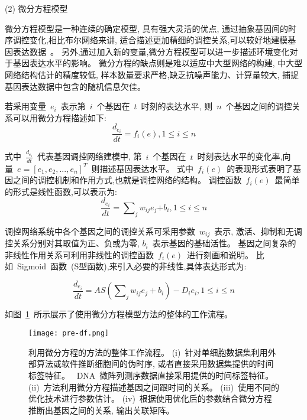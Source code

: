 (2) 微分方程模型

微分方程模型是一种连续的确定模型, 具有强大灵活的优点,
通过抽象基因间的时序调控变化,相比布尔网络来讲, 适合描述更加精细的调控关系,可以较好地建模基因表达数据~\cite{gardner2003inferring,di2005chemogenomic,bansal2006inference, honkela2010model,lu2011high,li2011large}。
另外,通过加入新的变量,微分方程模型可以进一步描述环境变化对于基因表达水平的影响。
微分方程的缺点则是难以适应中大型网络的构建, 中大型网络结构估计的精度较低,
样本数量要求严格,缺乏抗噪声能力、计算量较大, 捕捉基因表达数据中包含的随机信息欠佳。

若采用变量~$e_i$~表示第~$i$~个基因在~$t$~时刻的表达水平, 则~$n$~个基因之间的调控关系可以用微分方程描述如下:
\begin{equation}
\frac{{d_{e_i}}}{{dt}} = f_i (e),1 \le i \le n
\end{equation}

式中~$\frac{{d_{e_i }}}{{dt}}$~代表基因调控网络建模中,
第~$i$~个基因在~$t$~时刻表达水平的变化率,向量~$e=[e_1,e_2,...,e_n]^T$~则描述基因表达水平。
式中~$f_i(e)$~的表现形式表明了基因之间的调控机制和作用方式,也就是调控网络的结构。
调控函数~$f_i(e)$~最简单的形式是线性函数,可以表示为:
\begin{equation}
\frac{{d_{e_i }}}{{dt}} = \sum\nolimits_j {w_{ij} e_j} { + b_i } ,1 \le i \le n
\end{equation}

调控网络系统中各个基因之间的调控关系可采用参数~$w_{ij}$~表示,
激活、抑制和无调控关系分别对其取值为正、负或为零, $b_i$~表示基因的基础活性。
基因之间复杂的非线性作用关系可利用非线性的调控函数~$f_i(e)$~进行刻画和说明。
比如~Sigmoid~函数~(S型函数),来引入必要的非线性,具体表达形式为:

\begin{equation}
\frac{{d_{e_i } }}{{dt}} = AS(\sum\nolimits_j {w_{ij} e_j } + b_i) - D_i e_i ,1 \le i \le n
\end{equation}

如图~\ref{fig:pre-df}~所示展示了使用微分方程模型方法的整体的工作流程。
\begin{figure}[!htbp]
    \centering
    \texttt{[image: pre-df.png]}
    \caption{
        利用微分方程的方法的整体工作流程。
        (i)~针对单细胞数据集利用外部算法或软件推断细胞间的伪时序, 或者直接采用数据集提供的时间标签特征。
        ~DNA~微阵列测序数据直接采用提供的时间标签特征。
        (ii)~方法利用微分方程描述基因之间跟时间的关系。
        (iii)~使用不同的优化技术进行参数估计。
        (iv)~根据使用优化后的参数结合微分方程推断出基因之间的关系, 输出关联矩阵。
    }
    \label{fig:pre-df}
\end{figure}


